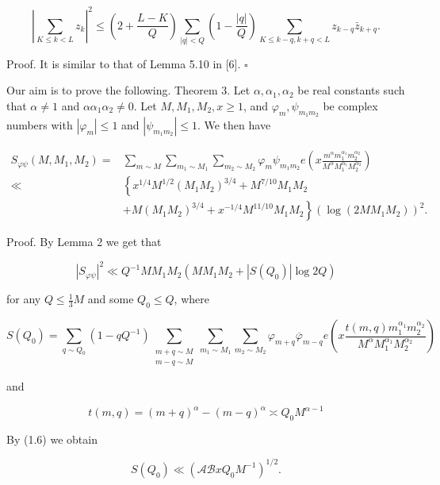 \documentclass[10pt]{article}
\begin{document}
$$
\left|\sum_{K \leqslant k<L} z_{k}\right|^{2} \leqslant\left(2+\frac{L-K}{Q}\right) \sum_{|q|<Q}\left(1-\frac{|q|}{Q}\right) \sum_{K \leqslant k-q, k+q<L} z_{k-q} \bar{z}_{k+q} .
$$

Proof. It is similar to that of Lemma 5.10 in [6]. \(\square\)

Our aim is to prove the following.
Theorem 3. Let $\alpha, \alpha_{1}, \alpha_{2}$ be real constants such that $\alpha \neq 1$ and $\alpha \alpha_{1} \alpha_{2} \neq 0$. Let $M, M_{1}, M_{2}, x \geqslant 1$, and $\varphi_{m}, \psi_{m_{1} m_{2}}$ be complex numbers with $\left|\varphi_{m}\right| \leqslant 1$ and $\left|\psi_{m_{1} m_{2}}\right| \leqslant 1$. We then have

$$
\begin{aligned}
S_{\varphi \psi}\left(M, M_{1}, M_{2}\right)= & \sum_{m \sim M} \sum_{m_{1} \sim M_{1}} \sum_{m_{2} \sim M_{2}} \varphi_{m} \psi_{m_{1}m_{2}} e\left(x \frac{m^{\alpha} m_{1}^{\alpha_{1}} m_{2}^{\alpha_{2}}}{M^{\alpha} M_{1}^{\alpha_{1}} M_{2}^{\alpha_{2}}}\right) \\
\ll & \left\{x^{1 / 4} M^{1 / 2}\left(M_{1} M_{2}\right)^{3 / 4}+M^{7 / 10} M_{1} M_{2}\right. \\
& \left.+M\left(M_{1} M_{2}\right)^{3 / 4}+x^{-1 / 4} M^{11 / 10} M_{1} M_{2}\right\}\left(\log\left(2 M M_{1} M_{2}\right)\right)^{2} .
\end{aligned}
$$

Proof. By Lemma 2 we get that

$$
\left|S_{\varphi \psi}\right|^{2} \ll Q^{-1} M M_{1} M_{2}\left(M M_{1} M_{2}+\left|S\left(Q_{0}\right)\right| \log 2 Q\right)
$$

for any $Q \leqslant \frac{1}{3} M$ and some $Q_{0} \leqslant Q$, where

$$
S\left(Q_{0}\right)=\sum_{q \sim Q_{0}}\left(1-q Q^{-1}\right) \sum_{\substack{m+q\sim M\\m-q\sim M}} \sum_{m_{1}\sim M_{1}} \sum_{m_{2}\sim M_{2}} \varphi_{m+q} \overline{\varphi}_{m-q} e\left(x \frac{t(m, q) m_{1}^{\alpha_{1}} m_{2}^{\alpha_{2}}}{M^{\alpha} M_{1}^{\alpha_{1}} M_{2}^{\alpha_{2}}}\right)
$$

and

$$
t(m, q)=(m+q)^{\alpha}-(m-q)^{\alpha} \asymp Q_{0} M^{\alpha-1}
$$

By (1.6) we obtain


\begin{equation*}
S\left(Q_{0}\right)\ll\left(\mathscr{A} \mathscr{B} x Q_{0} M^{-1}\right)^{1 / 2} . \tag{3.1}
\end{equation*}
\end{document}
